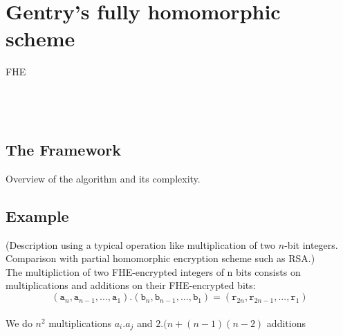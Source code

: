 \documentclass{acm_proc_article-sp}
\begin{document}
\section{Gentry's fully homomorphic scheme}
 FHE\\\\\\\
\subsection{The Framework}
Overview of the algorithm and its complexity. 

\subsection{Example}
(Description using a typical operation like multiplication of two $n$-bit integers. Comparison with partial homomorphic encryption scheme such as RSA.)\\
The multipliction of two FHE-encrypted integers of n bits consists on multiplications and additions on their FHE-encrypted bits: \[(\texttt{a}_{n},\texttt{a}_{n-1}, ... ,\texttt{a}_{1}) . (\texttt{b}_{n},\texttt{b}_{n-1}, ... ,\texttt{b}_{1}) = (\texttt{r}_{2n},\texttt{r}_{2n-1}, ... ,\texttt{r}_{1})\] \\
We do $ n^{2}$ multiplications $ a_i.a_j$ and $ 2.(n + (n-1)(n-2)$ additions
\end{document}
